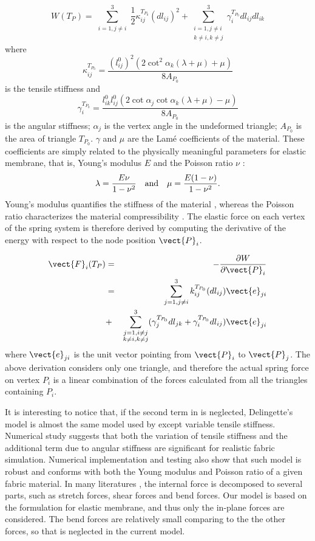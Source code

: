 \[
W(T_{P})=\sum_{\substack{i=1, j \neq i}}^{3}\frac{1}{2}\kappa_{ij}^{T_{P_0}}
(dl_{ij})^{2}+\sum_{\substack{i=1, j \neq i \\ k \neq i, k \neq j}}^{3}\gamma_{i}^{T_{P_0}}dl_{ij}dl_{ik} 
\]
where \[
\kappa_{ij}^{T_{P_0}}=\frac{(l_{ij}^{0})^{2}(2\cot^{2}\alpha_{k}
(\lambda+\mu)+\mu)}{8A_{P_0}} \] 
is the tensile stiffness and
\begin{equation}
\gamma_{i}^{T_{P_0}}=\frac{l_{ik}^{0}l_{ij}^{0}(2\cot\alpha_{j}
\cot\alpha_{k}(\lambda+\mu)-\mu)}{8A_{P_0}} \label{eq:angular_stiff}
\end{equation} 
is the angular stiffness; $\alpha_j$ is the vertex angle in the undeformed triangle; $A_{P_0}$ is the area of triangle $T_{P_0}$. $\gamma$ and $\mu$ are the Lam\'{e}
coefficients \cite{feng2013mathematical} of the material.  These coefficients are simply related to the
physically meaningful parameters for elastic membrane,
that is, Young's modulus $E$ \cite{feng2013mathematical} and the Poisson ratio $\nu$ \cite{feng2013mathematical}:
$$\lambda=\frac{E\nu}{1-\nu^{2}} ~~~{\rm and}~~~
\mu=\frac{E(1-\nu)}{1-\nu^{2}}.$$ 
Young's modulus quantifies the stiffness of
the material \cite{feng2013mathematical}, whereas the Poisson ratio characterizes the material
compressibility \cite{feng2013mathematical}. The elastic force on each vertex of the spring system is
therefore derived by computing the derivative of the energy with respect 
to the node position $\vect{P}_i$.

\begin{eqnarray} 
\vect{F}_i(T_{P}) & = & -\frac{\partial W}{\partial \vect{P}_i}\\
& = & \sum_{j = 1, j \neq i}^3 k^{T_{P_0}}_{ij}(dl_{ij})\vect{e}_{ji} \\
& + & \sum_{\substack{j=1, i\neq j \\ k \neq i, k \neq j}}^3
(\gamma_j^{T_{P_0}} dl_{jk} + \gamma_i^{T_{P_0}} dl_{ij}) \vect{e}_{ji}
\label{eq:v_force} 
\end{eqnarray} 
where $\vect{e}_{ji}$ is the unit vector pointing from $\vect{P}_i$ to $\vect{P}_j$.
The above derivation considers only one triangle, and therefore the actual spring force on vertex $P_i$ is a linear combination of the forces calculated from all the triangles containing $P_i$. 

It is interesting to notice that, if the second term in  is neglected, Delingette's model is almost the same model used by \cite{Kim2013Simulation} except variable tensile stiffness. Numerical study suggests that both the variation of tensile stiffness \cite{Delingette2008Triangular} and the additional term due to angular stiffness \cite{Delingette2008Triangular} are significant for realistic fabric simulation. Numerical implementation and testing also show that such model is robust and conforms with both the Young modulus and Poisson ratio of a given fabric material. In many literatures \cite{Baraff1998Large, Choi2005Stable}, the internal force is decomposed to several parts, such as stretch forces, shear forces and bend forces. Our model is based on the formulation for elastic membrane, and thus only the in-plane forces are considered. The bend forces are relatively small comparing to the the other forces, so that is neglected in the current model.

